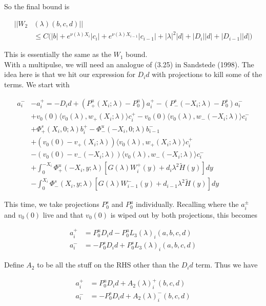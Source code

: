 \documentclass[12pt]{article}
\begin{document}
\begin{enumerate}
So the final bound is

\begin{align*}
||W_2&(\lambda)(b,c,d)|| \\
&\leq C \Big( |b| + e^{\nu(\lambda)X_i} |c_i| + e^{\nu(\lambda)X_{i-1}} |c_{i-1}| 
+ |\lambda|^2 |d| + |D_i||d| + |D_{i-1}||d|)
\end{align*}

This is essentially the same as the $W_1$ bound.\\

With a multipulse, we will need an analogue of (3.25) in Sandstede (1998). The idea here is that we hit our expression for $D_i d$ with projections to kill some of the terms. We start with

\begin{align*}
a_i^- &- a_i^+ = -D_i d + (P^u_+(X_i; \lambda) - P_0^u)a_i^+ - (P^s_-(-X_i; \lambda) - P_0^s)a_i^- \\
&+ v_0(0) \langle v_0(\lambda), w_+(X_i; \lambda) \rangle c_i^+ 
- v_0(0) \langle v_0(\lambda), w_-(-X_i; \lambda) \rangle c_i^- \\
&+ \Phi^s_+(X_i, 0; \lambda)b_i^+ - \Phi^u_-(-X_i, 0; \lambda)b_{i-1}^- \\
&+ (v_0(0) - v_+(X_i; \lambda)) \langle v_0(\lambda), w_+(X_i; \lambda) \rangle c_i^+ \\
&- (v_0(0) - v_-(-X_i; \lambda)) \langle v_0(\lambda), w_-(-X_i; \lambda) \rangle c_i^- \\
&+ \int_0^{-X_i} \Phi^u_+(-X_i, y; \lambda) [ G(\lambda)W_i^+(y) + d_i \lambda^2 \tilde{H}(y) ] dy \\
&- \int_0^{X_i} \Phi^s_-(X_i, y; \lambda) [ G(\lambda)W_{i-1}^-(y) + d_{i-1} \lambda^2 \tilde{H}(y) ] dy  
\end{align*}

This time, we take projections $P^s_0$ and $P^u_0$ individually. Recalling where the $a_i^\pm$ and $v_0(0)$ live and that $v_0(0)$ is wiped out by both projections, this becomes 

\begin{align*}
a_i^+ &= P^u_0 D_i d - P^u_0 L_3(\lambda)_i(a, b, c, d) \\
a_i^- &= -P^s_0 D_i d + P^s_0 L_3(\lambda)_i(a, b, c, d)
\end{align*}

Define $A_2$ to be all the stuff on the RHS other than the $D_i d$ term. Thus we have 

\begin{align*}
a_i^+ &= P^u_0 D_i d + A_2(\lambda)_i^+(b, c, d) \\
a_i^- &= -P^s_0 D_i d + A_2(\lambda)_i^-(b, c, d)
\end{align*}


\end{enumerate}
\end{document}
